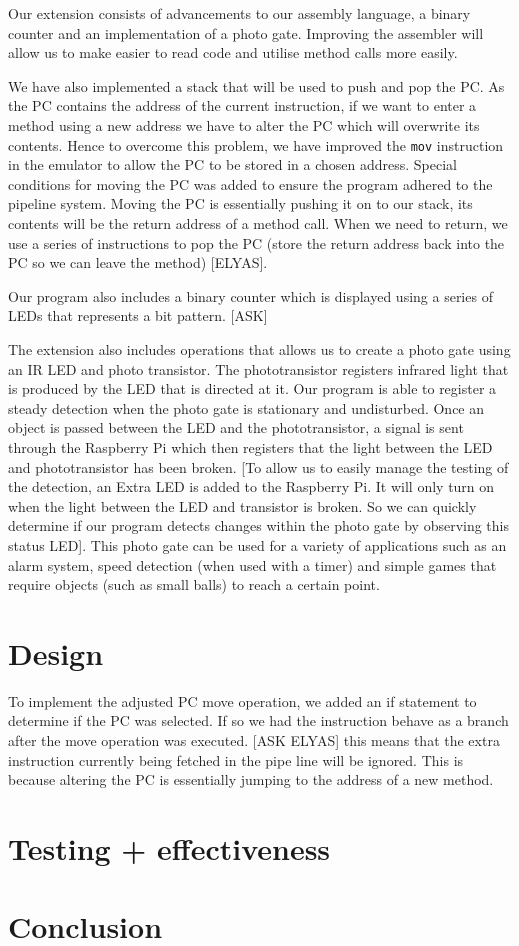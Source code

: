 \documentclass[11pt]{article}
\begin{document}
Our extension consists of advancements to our assembly language, a binary counter and an implementation of a photo gate. Improving the assembler will allow us to make easier to read code and utilise method calls more easily.\newline

\noindent We have also implemented a stack that will be used to push and pop the PC. As the PC contains the address of the current instruction, if we want to enter a method using a new address we have to alter the PC which will overwrite its contents. Hence to overcome this problem, we have improved the \texttt{mov} instruction in the emulator to allow the PC to be stored in a chosen address. Special conditions for moving the PC was added to ensure the program adhered to the pipeline system.  Moving the PC is essentially pushing it on to our stack, its contents will be the return address of a method call. When we need to return, we use a series of instructions to pop the PC (store the return address back into the PC so we can leave the method) [ELYAS].\newline

\noindent Our program also includes a binary counter which is displayed using a series of LEDs that represents a bit pattern. [ASK]\newline

\noindent The extension also includes operations that allows us to create a photo gate using an IR LED and photo transistor. The phototransistor registers infrared light that is produced by the LED that is directed at it. Our program is able to register a steady detection when the photo gate is stationary and undisturbed. Once an object is passed between the LED and the phototransistor, a signal is sent through the Raspberry Pi which then registers that the light between the LED and phototransistor has been broken. [To allow us to easily manage the testing of the detection, an Extra LED is added to the Raspberry Pi. It will only turn on when the light between the LED and transistor is broken. So we can quickly determine if our program detects changes within the photo gate by observing this status LED]. This photo gate can be used for a variety of applications such as an alarm system, speed detection (when used with a timer) and simple games that require objects (such as small balls) to reach a certain point.

\section{Design}
To implement the adjusted PC move operation, we added an if statement to determine if the PC was selected. If so we had the instruction behave as a branch after the move operation was executed. [ASK ELYAS] this means that the extra instruction currently being fetched in the pipe line will be ignored. This is because altering the PC is essentially jumping to the address of a new method.

\section{Testing + effectiveness}

\section{Conclusion}
\end{document}
